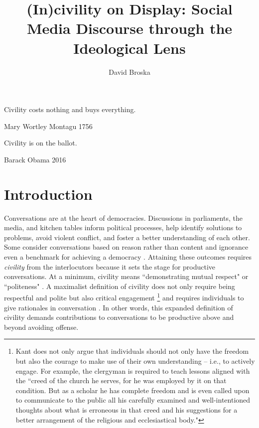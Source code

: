 \documentclass{article}
\title{(In)civility on Display: Social Media Discourse through the Ideological Lens}
\author[1]{David Broska}
\begin{document}
\maketitle

\epigraph{Civility costs nothing and buys everything.}{Mary Wortley Montagu 1756}
\epigraph{Civility is on the ballot.}{Barack Obama 2016}

\section{Introduction}

Conversations are at the heart of democracies. Discussions in parliaments, the media, and kitchen tables inform political processes, help identify solutions to problems, avoid violent conflict, and foster a better understanding of each other. Some consider conversations based on reason rather than content and ignorance even a benchmark for achieving a democracy \citep{sanders_against_1997}. Attaining these outcomes requires \textit{civility} from the interlocutors because it sets the stage for productive conversations. 
At a minimum,  civility means ``demonstrating mutual respect" \citep{mutz_inyourface_2016} or ``politeness" \citep{frimer_montagu_2018}. A maximalist definition of civility does not only require being respectful and polite but also critical engagement \citep{kant_enlightenment_1784}\footnote{Kant does not only argue that individuals should not only have the freedom but also the courage to make use of their own understanding -- i.e., to actively engage. For example, the clergyman is required to teach lessons aligned with the ``creed of the church he serves, for he was employed by it on that condition. But as a scholar he has complete freedom and is even called upon to communicate to the public all his carefully examined and well-intentioned thoughts about what is erroneous in that creed and his suggestions for a better arrangement of the religious and ecclesiastical body."} and requires individuals to give rationales in conversation \citep{habermas1985theory}. In other words, this expanded definition of civility demands contributions to conversations to be productive above and beyond avoiding offense.
\end{document}
